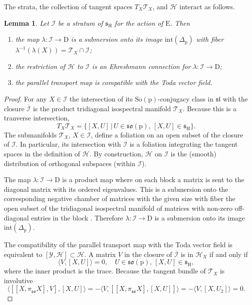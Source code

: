 \documentclass[reqno]{amsart}
\newcommand{\p}{\mathrm{p}}
\renewcommand{\ss}{\mathfrak{s}}
\renewcommand{\sl}{\mathfrak{sl}}
\newcommand{\so}{\mathfrak{so}}
\newcommand{\cH}{\mathcal{H}}
\newcommand{\cI}{\mathcal{I}}
\newcommand{\cT}{\mathcal{T}}
\newcommand{\cY}{\mathcal{Y}}
\newcommand{\E}{\mathrm{E}}
\newcommand{\So}{\mathrm{So}}
\renewcommand{\H}{\mathrm{H}}
\newtheorem{lemma}[theorem]{Lemma}
\begin{document}
The strata, the collection of tangent spaces $T_X\cT_X$, and  $\cH$ interact as follows.
\begin{lemma}\label{lem:Ehreshmann}   Let $\cI$ be a stratum of $\ss_\H$ for the action of $\E$. Then
\begin{enumerate}
 \item the map $\lambda:\cI\to \mathrm{D}$ is a submersion onto its image $\mathrm{int}(\Delta_{\p})$ with fiber $\lambda^{-1}(\lambda(X))=\cT_X\cap \cI$;
 \item the restriction of $\cH$ to $\cI$ is an Ehreshmann connection for $\lambda:\cI\to \mathrm{D}$;
 \item the parallel transport map is compatible with the Toda vector field.
\end{enumerate}
\end{lemma}
\begin{proof}
 For any  $X\in \cI$ the intersection of its $\So(\p)$-conjugacy class in $\sl$ with the closure $\overline{\cI}$ is the product tridiagonal isospectral manifold $\cT_X$. Because this is a tranverse intersection,
\[T_X\cT_X=\{[X,U]\,|\, U\in \so(\p),\,[X,U]\in \ss_\H\}.\]
 The submanifolds $\cT_X$, $X\in\cI$, define a foliation on an open subset of the closure of $\cI$. In particular, its  intersection with $\cI$ is a foliation  integrating  the tangent spaces in the definition of $\cH$. By construction, $\cH$ on $\cI$ is the (smooth) distribution of orthogonal subspaces (within $\cI$).

The map $\lambda:\cI\to \mathrm{D}$ is a product map where on each block a matrix is sent to the diagonal matrix with its ordered eigenvalues. This is a submersion onto the corresponding negative chamber of matrices with the given size with fiber the open subset of the tridiagonal isospectral manifold of matrices with non-zero off-diagonal entries in the block \cite[Remark 2 after Lemma 2.2]{To}. Therefore $\lambda:\cI\to \mathrm{D}$ is a submersion onto its image $\mathrm{int}(\Delta_\p)$.

The compatibility of the parallel transport map with the Toda vector field is equivalent to
$[\cY,\cH]\subset \cH$.
A matrix $V$ in the closure of $\overline{\cI}$ is in $\cH_X$ if and only if
\[\langle V,[X,U]\rangle=0,\quad  U\in \so(\p),\,[X,U]\in \ss_\H,\]
where the inner product is the trace. Because the tangent bundle of $\cT_X$ is involutive
\[\langle [[X,\pi_{\so}X],V],[X,U]\rangle=-\langle V,[[X,\pi_{\so}X],[X,U]]\rangle=-\langle V,[X,U_2]\rangle=0.\]
\end{proof}
\end{document}
